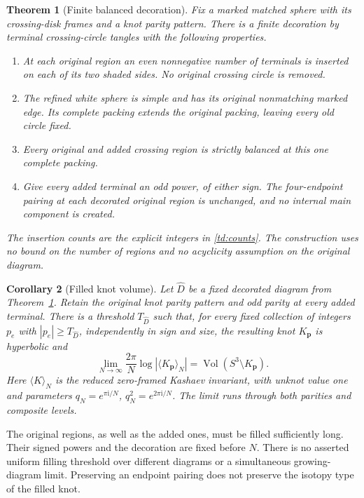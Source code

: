 \documentclass[11pt]{article}
\numberwithin{equation}{section}
\newtheorem{theorem}{Theorem}[section]
\newtheorem{corollary}[theorem]{Corollary}
\theoremstyle{definition}
\newcommand{\ii}{\mathrm i}
\newcommand{\Vol}{\operatorname{Vol}}
\begin{document}
\begin{theorem}[Finite balanced decoration]\label{td:main}
Fix a marked matched sphere with its crossing-disk frames and a
knot parity pattern. There is a finite decoration by terminal
crossing-circle tangles with the following properties.
\begin{enumerate}[label=\textup{(\roman*)},leftmargin=*]
\item At each original region an even nonnegative number of
terminals is inserted on each of its two shaded sides. No original
crossing circle is removed.
\item The refined white sphere is simple and has its original
nonmatching marked edge. Its complete packing extends the original
packing, leaving every old circle fixed.
\item Every original and added crossing region is strictly balanced
at this one complete packing.
\item Give every added terminal an odd power, of either sign.
The four-endpoint pairing at each decorated original region is
unchanged, and no internal main component is created.
\end{enumerate}
The insertion counts are the explicit integers in
\eqref{td:counts}. The construction uses no bound on the number
of regions and no acyclicity assumption on the original diagram.
\end{theorem}

\begin{corollary}[Filled knot volume]\label{td:volume}
Let \(\widehat D\) be a fixed decorated diagram from
Theorem~\ref{td:main}. Retain the original knot parity pattern and
odd parity at every added terminal. There is a threshold
\(T_{\widehat D}\) such that, for every fixed collection of integers
\(p_e\) with \(|p_e|\ge T_{\widehat D}\), independently in sign and
size, the resulting knot \(K_{\boldsymbol p}\) is hyperbolic and
\begin{equation}\label{td:volume-limit}
 \lim_{N\to\infty}\frac{2\pi}{N}
      \log\left|\langle K_{\boldsymbol p}\rangle_N\right|
       =\Vol(S^3\setminus K_{\boldsymbol p}).
\end{equation}
Here \(\langle K\rangle_N\) is the reduced zero-framed Kashaev
invariant, with unknot value one and parameters
\(q_N=e^{\pi\ii/N}\), \(q_N^2=e^{2\pi\ii/N}\). The limit runs
through both parities and composite levels.
\end{corollary}

The original regions, as well as the added ones, must be filled
sufficiently long. Their signed powers and the decoration are fixed
before \(N\). There is no asserted uniform filling threshold over
different diagrams or a simultaneous growing-diagram limit.
Preserving an endpoint pairing does not preserve the isotopy type
of the filled knot.
\end{document}
